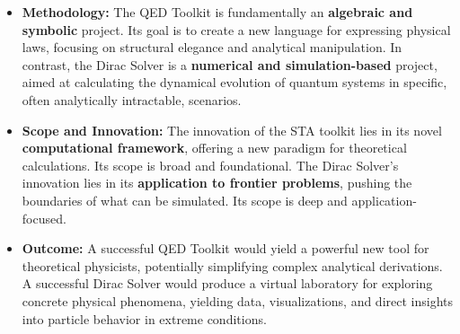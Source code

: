 \documentclass[11pt, letterpaper]{article}
\theoremstyle{definition}
\theoremstyle{remark}
\begin{document}
\begin{itemize}
	\item \textbf{Methodology:} The QED Toolkit is fundamentally an
		\textbf{algebraic and symbolic} project. Its goal is to create a new
		language for expressing physical laws, focusing on structural elegance and
		analytical manipulation. In contrast, the Dirac Solver is a
		\textbf{numerical and simulation-based} project, aimed at calculating the
		dynamical evolution of quantum systems in specific, often analytically
		intractable, scenarios.
	\item \textbf{Scope and Innovation:} The innovation of the STA toolkit lies in
		its novel \textbf{computational framework}, offering a new paradigm for
		theoretical calculations. Its scope is broad and foundational. The Dirac
		Solver's innovation lies in its \textbf{application to frontier problems},
		pushing the boundaries of what can be simulated. Its scope is deep and
		application-focused.
	\item \textbf{Outcome:} A successful QED Toolkit would yield a powerful new
		tool for theoretical physicists, potentially simplifying complex analytical
		derivations. A successful Dirac Solver would produce a virtual laboratory
		for exploring concrete physical phenomena, yielding data, visualizations,
		and direct insights into particle behavior in extreme conditions.
\end{itemize}
\end{document}
